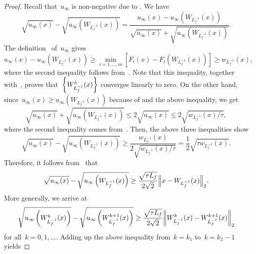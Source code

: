 \documentclass[../main]{subfiles}
\begin{document}
\begin{proof}
    Recall that~$u_\infty$ is non-negative due to .
    We have
    \begin{equation}
        \sqrt{u_\infty(x)} - \sqrt{u_\infty\left(W_{L_f^{-1}}(x)\right)} = \frac{u_\infty(x) - u_\infty\left(W_{L_f^{-1}}(x)\right)}{\sqrt{u_\infty(x)} + \sqrt{u_\infty\left(W_{L_f^{-1}}(x)\right)}}
    .\end{equation}
    The definition~ of~$u_\infty$ gives
    \begin{equation}
        u_\infty(x) - u_\infty\left(W_{L_f^{-1}}(x)\right) \ge \min_{i = 1, \dots, m} \left[F_i(x) - F_i\left(W_{L_f^{-1}}(x)\right)\right] \ge w_{L_f^{-1}}(x)
    ,\end{equation}
    where the second inequality follows from~.
    Note that this inequality, together with~, proves that~$\set*{W_{L_f^{-1}}^k(x)}$ converges linearly to zero.
    On the other hand, since~$u_\infty(x) \ge u_\infty\left(W_{L_f^{-1}}(x)\right)$ because of  and the above inequality, we get
    \begin{equation}
        \sqrt{u_\infty(x)} + \sqrt{u_\infty\left(W_{L_f^{-1}}(x)\right)} \le 2 \sqrt{u_\infty(x)} \le 2 \sqrt{w_{L_f^{-1}}(x) / \tau}
    ,\end{equation}
    where the second inequality comes from~.
    Then, the above three inequalities show
    \begin{equation}
        \sqrt{u_\infty(x)} - \sqrt{u_\infty\left(W_{L_f^{-1}}(x)\right)} \ge \frac{w_{L_f^{-1}}(x)}{2 \sqrt{w_{L_f^{-1}}(x) / \tau}} = \frac{1}{2} \sqrt{\tau w_{L_f^{-1}}(x)}
    .\end{equation}
    Therefore, it follows from~ that
    \begin{equation}
        \sqrt{u_\infty(x)} - \sqrt{u_\infty\left(W_{L_f^{-1}}(x)\right)} \ge \frac{\sqrt{\tau L_f}}{2 \sqrt{2}} \norm*{x - W_{L_f^{-1}}(x)}_2
    .\end{equation}
    More generally, we arrive at
    \begin{equation}
        \sqrt{u_\infty\left(W_{L_f^{-1}}^k(x)\right)} - \sqrt{u_\infty\left(W_{L_f^{-1}}^{k + 1}(x)\right)} \ge \frac{\sqrt{\tau L_f}}{2 \sqrt{2}} \norm*{W_{L_f^{-1}}^k(x) - W_{L_f^{-1}}^{k + 1}(x)}_2
    \end{equation}
    for all~$k = 0, 1, \dots$.
    Adding up the above inequality from~$k = k_1$ to~$k = k_2 - 1$ yields

\end{proof}
\end{document}
